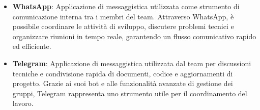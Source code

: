 \begin{itemize}
    \item \textbf{WhatsApp}: Applicazione di messaggistica utilizzata come strumento di comunicazione interna tra i membri del team. Attraverso WhatsApp, è possibile coordinare le attività di sviluppo, discutere problemi tecnici e organizzare riunioni in tempo reale, garantendo un flusso comunicativo rapido ed efficiente.

    \item \textbf{Telegram}: Applicazione di messaggistica utilizzata dal team per discussioni tecniche e condivisione rapida di documenti, codice e aggiornamenti di progetto. Grazie ai suoi bot e alle funzionalità avanzate di gestione dei gruppi, Telegram rappresenta uno strumento utile per il coordinamento del lavoro.

\end{itemize}
